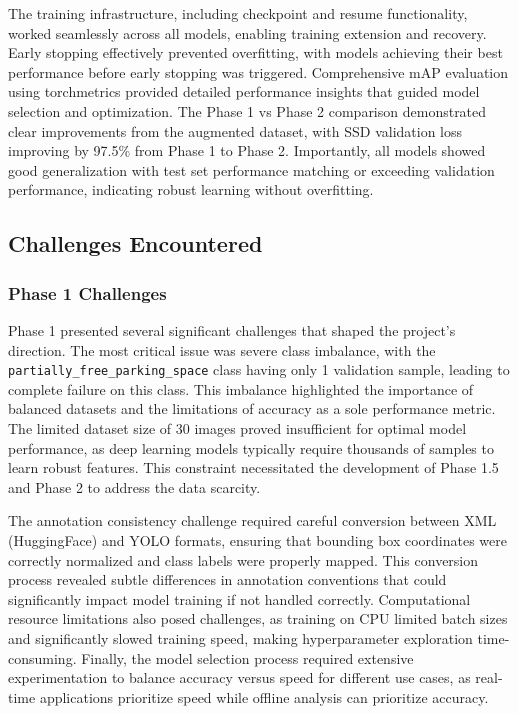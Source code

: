 \documentclass[12pt,a4paper]{article}
\begin{document}
The training infrastructure, including checkpoint and resume functionality, worked seamlessly across all models, enabling training extension and recovery. Early stopping effectively prevented overfitting, with models achieving their best performance before early stopping was triggered. Comprehensive mAP evaluation using torchmetrics provided detailed performance insights that guided model selection and optimization. The Phase 1 vs Phase 2 comparison demonstrated clear improvements from the augmented dataset, with SSD validation loss improving by 97.5\% from Phase 1 to Phase 2. Importantly, all models showed good generalization with test set performance matching or exceeding validation performance, indicating robust learning without overfitting.

\subsection{Challenges Encountered}

\subsubsection{Phase 1 Challenges}

Phase 1 presented several significant challenges that shaped the project's direction. The most critical issue was severe class imbalance, with the \texttt{partially\_free\_parking\_space} class having only 1 validation sample, leading to complete failure on this class. This imbalance highlighted the importance of balanced datasets and the limitations of accuracy as a sole performance metric. The limited dataset size of 30 images proved insufficient for optimal model performance, as deep learning models typically require thousands of samples to learn robust features. This constraint necessitated the development of Phase 1.5 and Phase 2 to address the data scarcity.

The annotation consistency challenge required careful conversion between XML (HuggingFace) and YOLO formats, ensuring that bounding box coordinates were correctly normalized and class labels were properly mapped. This conversion process revealed subtle differences in annotation conventions that could significantly impact model training if not handled correctly. Computational resource limitations also posed challenges, as training on CPU limited batch sizes and significantly slowed training speed, making hyperparameter exploration time-consuming. Finally, the model selection process required extensive experimentation to balance accuracy versus speed for different use cases, as real-time applications prioritize speed while offline analysis can prioritize accuracy.
\end{document}
